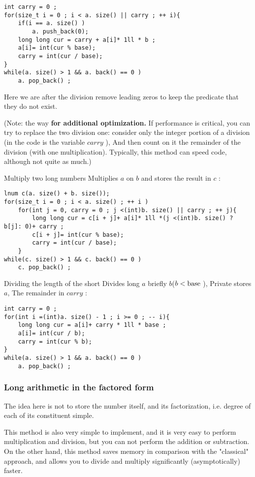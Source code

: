 \begin{verbatim}
int carry = 0 ;
for(size_t i = 0 ; i < a. size() || carry ; ++ i){
    if(i == a. size() )
        a. push_back(0);
    long long cur = carry + a[i]* 1ll * b ;
    a[i]= int(cur % base);
    carry = int(cur / base);
}
while(a. size() > 1 && a. back() == 0 )
    a. pop_back() ; 
\end{verbatim}
Here we are after the division remove leading zeros to keep the predicate that they do not exist.

(Note: the way \textbf{for additional optimization.} If performance is critical, you can try to replace the two division one: consider only the integer portion of a division (in the code is the variable $carry$ ), And then count on it the remainder of the division (with one multiplication). Typically, this method can speed code, although not quite as much.)

Multiply two long numbers
Multiplies $a$ on $b$ and stores the result in $c$ :

\begin{verbatim}
lnum c(a. size() + b. size());
for(size_t i = 0 ; i < a. size() ; ++ i )
    for(int j = 0, carry = 0 ; j <(int)b. size() || carry ; ++ j){
        long long cur = c[i + j]+ a[i]* 1ll *(j <(int)b. size() ? b[j]: 0)+ carry ;
        c[i + j]= int(cur % base);
        carry = int(cur / base);
    }
while(c. size() > 1 && c. back() == 0 )
    c. pop_back() ; 
\end{verbatim}
Dividing the length of the short
Divides long $a$ briefly $b$($b <{\rm base}$ ), Private stores $a$, The remainder in $carry$ :

\begin{verbatim}
int carry = 0 ;
for(int i =(int)a. size() - 1 ; i >= 0 ; -- i){
    long long cur = a[i]+ carry * 1ll * base ;
    a[i]= int(cur / b);
    carry = int(cur % b);
}
while(a. size() > 1 && a. back() == 0 )
    a. pop_back() ; 
\end{verbatim}
\subsubsection{ Long arithmetic in the factored form }

The idea here is not to store the number itself, and its factorization, i.e. degree of each of its constituent simple.

This method is also very simple to implement, and it is very easy to perform multiplication and division, but you can not perform the addition or subtraction. On the other hand, this method saves memory in comparison with the "classical" approach, and allows you to divide and multiply significantly (asymptotically) faster.

